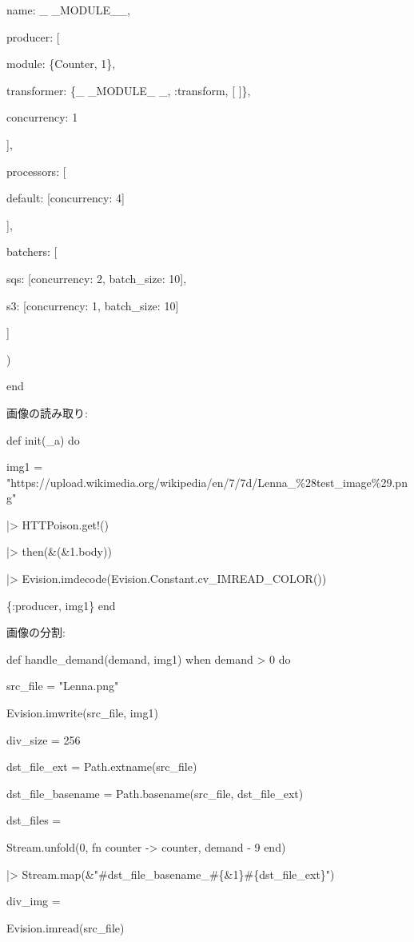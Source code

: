 \documentclass[a4paper]{jreport}	%
\begin{document}
      name: \_ \_MODULE\_\_,
      
      producer: [
      
        module: \{Counter, 1\},
        
        transformer: \{\_ \_MODULE\_ \_, :transform, [ ]\},
        
        concurrency: 1
        
       ],
       
      processors: [
      
        default: [concurrency: 4]
        
      ],
      
        batchers: [
        
        sqs: [concurrency: 2, batch\_size: 10],
        
        s3: [concurrency: 1, batch\_size: 10]
        
      ]
      
    )
    
end

画像の読み取り:

def init(\_a) do

    img1 = 
      "https://upload.wikimedia.org/wikipedia/en/7/7d/Lenna\_\%28test\_image\%29.png"
      
  |> HTTPoison.get!()
  
  |> then(\&(\&1.body))
  
  |> Evision.imdecode(Evision.Constant.cv\_IMREAD\_COLOR()) 
  
  \{:producer, img1\}
end

画像の分割:

def handle\_demand(demand, img1) when demand > 0 do   

    src\_file = "Lenna.png"
    
    Evision.imwrite(src\_file, img1)
    
    div\_size = 256
    
    dst\_file\_ext = Path.extname(src\_file)
    
    dst\_file\_basename = Path.basename(src\_file, dst\_file\_ext)
    
    dst\_files =
    
      Stream.unfold(0, fn counter -> {counter, demand - 9} end)
      
      |> Stream.map(\&"\#{dst\_file\_basename}\_\#\{\&1\}\#\{dst\_file\_ext\}")
    
    div\_img =
    
    Evision.imread(src\_file)
    
\end{document}
